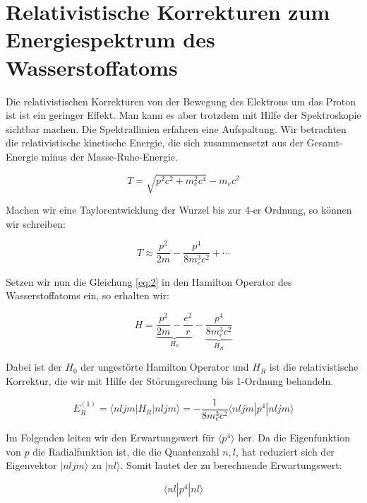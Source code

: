 
\usepackage{amsmath}




\section*{Relativistische Korrekturen zum Energiespektrum des Wasserstoffatoms}


Die relativistischen Korrekturen von der Bewegung des Elektrons um das Proton ist ist ein geringer Effekt. Man kann es aber trotzdem mit Hilfe der Spektroskopie sichtbar machen. Die Spektrallinien erfahren eine Aufspaltung. Wir betrachten die relativistische kinetische Energie, die sich zusammensetzt aus der Gesamt-Energie minus der Masse-Ruhe-Energie.

\begin{equation}
  \label{eq:1}
  T = \sqrt{p^2c^2+m_e^2c^4}-m_ec^2
\end{equation}


Machen wir eine Taylorentwicklung der Wurzel bis zur 4-er Ordnung, so können wir schreiben:

\begin{equation}
  \label{eq:2}
  T \approx \frac{p^2}{2m}-\frac{p^4}{8m_e^3c^2}+\cdots
\end{equation}


Setzen wir nun die Gleichung \eqref{eq:2} in den Hamilton Operator des Wasserstoffatoms ein, so erhalten wir:


\begin{equation}
  \label{eq:3}
  H = \underbrace{\frac{p^2}{2m}-\frac{e^2}{r}}_{H_0}-\underbrace{\frac{p^4}{8m_e^3c^2}}_{H_R}
\end{equation}


Dabei ist der \(H_0\) der ungestörte Hamilton Operator und \(H_R\) ist die relativistische Korrektur, die wir mit Hilfe der Störungsrechung bis 1-Ordnung behandeln.

\begin{equation}
  \label{eq:4}
  E^{(1)}_R = \langle nljm|H_R|nljm\rangle  = - \frac{1}{8m_e^3c^2}\langle nljm|p^4|nljm\rangle
\end{equation}

Im Folgenden leiten wir den Erwartungswert für \(\langle p^4 \rangle \) her. Da die Eigenfunktion von \(p\) die Radialfunktion ist, die die Quantenzahl \(n,l\), hat reduziert sich der Eigenvektor  \(|nljm\rangle \)  zu \(|nl\rangle \). Somit lautet der zu berechnende Erwartungswert:

\begin{equation}
  \label{eq:5}
  \langle nl|p^4|nl\rangle
\end{equation}


